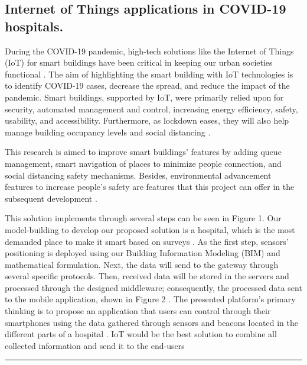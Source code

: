 \documentclass[12pt, letterpaper]{article}
\begin{document}
\begin{center}
\section{Internet of Things applications in COVID-19 hospitals.}
During the COVID-19 pandemic, high-tech solutions like the Internet of Things (IoT) for smart buildings have been critical in keeping our urban societies functional . The aim of highlighting the smart building with IoT technologies is to identify COVID-19 cases, decrease the spread, and reduce the impact of the pandemic. Smart buildings, supported by IoT, were primarily relied upon for security, automated management and control, increasing energy efficiency, safety, usability, and accessibility. Furthermore, as lockdown eases, they will also help manage building occupancy levels and social distancing .

This research is aimed to improve smart buildings’ features by adding queue management, smart navigation of places to minimize people connection, and social distancing safety mechanisms. Besides, environmental advancement features to increase people’s safety are features that this project can offer in the subsequent development .

This solution implements through several steps can be seen in Figure 1. Our model-building to develop our proposed solution is a hospital, which is the most demanded place to make it smart based on surveys . As the first step, sensors’ positioning is deployed using our Building Information Modeling (BIM) and mathematical formulation. Next, the data will send to the gateway through several specific protocols. Then, received data will be stored in the servers and processed through the designed middleware; consequently, the processed data sent to the mobile application, shown in Figure 2 . The presented platform’s primary thinking is to propose an application that users can control through their smartphones using the data gathered through sensors and beacons located in the different parts of a hospital . IoT would be the best solution to combine all collected information and send it to the end-users 
\rule{\textwidth}{0.5pt}

\end{center}
\end{document}
